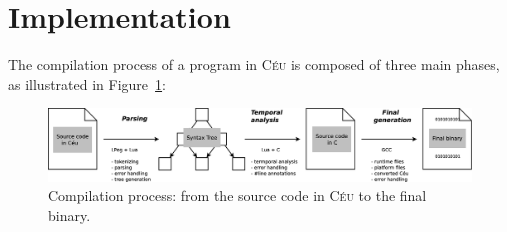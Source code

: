 \documentclass{sigplanconf}
\newcommand{\CEU}{\textsc{C\'{e}u}\xspace}
\newcommand{\1}{\;}
\newcommand{\2}{\;\;}
\newcommand{\3}{\;\;\;}
\newcommand{\5}{\;\;\;\;\;}
\begin{document}
\section{Implementation}

The compilation process of a program in \CEU is composed of three main phases, 
as illustrated in Figure~\ref{fig.impl}:

\begin{figure}[ht]
\centering
\includegraphics[scale=0.20]{impl}
\caption{ Compilation process: from the source code in \CEU to the final 
binary.
\label{fig.impl}
}
\end{figure}

\end{document}
